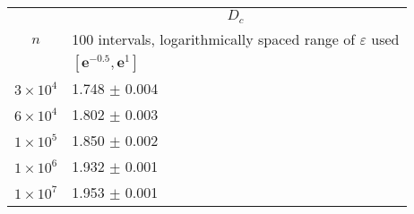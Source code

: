 \begin{center}
\begin{tabular}{ |l|l| }
\hline
\multicolumn{1}{|c|}{\multirow{3}{*}{$n$}} & \multicolumn{1}{|c|}{$D_{c} $}\\
\cline{2-2}
&\multicolumn{1}{|c|}{100 intervals, logarithmically spaced range of $\varepsilon$ used}\\
\cline{2-2}
 &\rule{0pt}{12pt} \hspace{85pt} $[\boldsymbol{e}^{-0.5},\boldsymbol{e}^{1}]$ \\
\hline
$3\times 10^{4}$ & \hspace{80pt} 1.748 $\pm$ 0.004  \\
\hline
$6\times 10^{4}$ & \hspace{80pt} 1.802 $\pm$ 0.003  \\
\hline
$1\times 10^{5}$ & \hspace{80pt} 1.850 $\pm$ 0.002   \\
\hline
$1\times 10^{6}$ & \hspace{80pt} 1.932 $\pm$ 0.001   \\
\hline
$1\times 10^{7}$ & \hspace{80pt} 1.953 $\pm$ 0.001 \\
\hline
\end{tabular}
\end{center}

